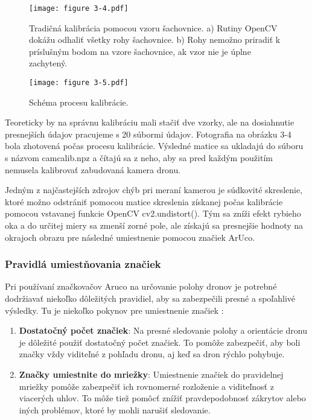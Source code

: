 {\begin{figure}[ht!]
    \centering
    \texttt{[image: figure 3-4.pdf]}
    \caption{Tradičná kalibrácia pomocou vzoru šachovnice. a) Rutiny OpenCV dokážu odhaliť všetky rohy šachovnice. b) Rohy nemožno priradiť k príslušným bodom na vzore šachovnice, ak vzor nie je úplne zachytený.}
    \label{o:3-4}
\end{figure}  

\begin{figure}[ht!]
    \centering
    \texttt{[image: figure 3-5.pdf]}
    \caption{Schéma procesu kalibrácie.}
    \label{o:3-5}
\end{figure}  

Teoreticky by na správnu kalibráciu mali stačiť dve vzorky, ale na dosiahnutie presnejších údajov pracujeme s 20 súbormi údajov. Fotografia na obrázku 3-4 bola zhotovená počas procesu kalibrácie. Výsledné matice sa ukladajú do súboru s názvom camcalib.npz a čítajú sa z neho, aby sa pred každým použitím nemusela kalibrovať zabudovaná kamera dronu. 

Jedným z najčastejších zdrojov chýb pri meraní kamerou je súdkovité skreslenie, ktoré možno odstrániť pomocou matice skreslenia získanej počas kalibrácie pomocou vstavanej funkcie OpenCV cv2.undistort(). Tým sa zníži efekt rybieho oka a do určitej miery sa zmenší zorné pole, ale získajú sa presnejšie hodnoty na okrajoch obrazu pre následné umiestnenie pomocou značiek ArUco.
\subsubsection{Pravidlá umiestňovania značiek}
Pri používaní značkovačov Aruco na určovanie polohy dronov je potrebné dodržiavať niekoľko dôležitých pravidiel, aby sa zabezpečili presné a spoľahlivé výsledky. Tu je niekoľko pokynov pre umiestnenie značiek \citep{Marut2019}:
\begin{enumerate}

\item \textbf{Dostatočný počet značiek}: Na presné sledovanie polohy a orientácie dronu je dôležité použiť dostatočný počet značiek. To pomôže zabezpečiť, aby boli značky vždy viditeľné z pohľadu dronu, aj keď sa dron rýchlo pohybuje.

\item \textbf{Značky umiestnite do mriežky}: Umiestnenie značiek do pravidelnej mriežky pomôže zabezpečiť ich rovnomerné rozloženie a viditeľnosť z viacerých uhlov. To môže tiež pomôcť znížiť pravdepodobnosť zákrytov alebo iných problémov, ktoré by mohli narušiť sledovanie.


\end{enumerate}}
